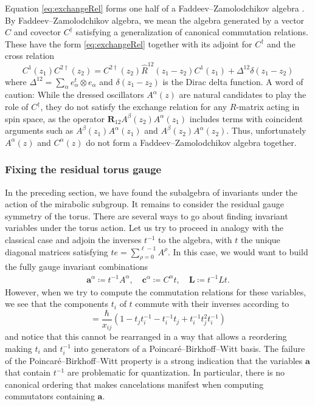 \begin{remark}\label{rem:FZAlg}
Equation \eqref{eq:exchangeRel} forms one half of a Faddeev--Zamolodchikov algebra \cite{zamolodchikov_factorized_1979,faddeev_quantum_1995}. By Faddeev--Zamolod\-chikov algebra, we mean the algebra generated by a vector $C$ and covector $C^\dagger$ satisfying a generalization of canonical commutation relations. These have the form \eqref{eq:exchangeRel} together with its adjoint for $C^\dagger$ and the cross relation
\begin{equation}
C^1(z_1) C^{2\dagger}(z_2) = C^{2\dagger}(z_2) \hat R^{12}(z_1-z_2) C^1(z_1) + \Delta^{12} \delta(z_1-z_2)    
\end{equation}
where $\Delta^{12} = \sum_\alpha e_\alpha^t \otimes e_\alpha$ and $\delta(z_1-z_2)$ is the Dirac delta function. A word of caution: While the dressed oscillators $A^\alpha(z)$ are natural candidates to play the role of $C^\dagger$, they do not satisfy the exchange relation for any $R$-matrix acting in spin space, as the operator $\mathbf{R}_{12} A^\beta(z_2) A^\alpha(z_1)$ includes terms with coincident arguments such as $A^\beta(z_1) A^\alpha(z_1)$ and $A^\beta(z_2) A^\alpha(z_2)$. Thus, unfortunately $A^\alpha(z)$ and $C^\alpha(z)$ do not form a Faddeev--Zamolodchikov algebra together.
\end{remark}

\subsubsection{Fixing the residual torus gauge}

In the preceding section, we have found the subalgebra of invariants under the action of the mirabolic subgroup. It remains to consider the residual gauge symmetry of the torus. There are several ways to go about finding invariant variables under the torus action. Let us try to proceed in analogy with the classical case and adjoin the inverses $t^{-1}$ to the algebra, with $t$ the unique diagonal matrices satisfying $te = \sum_{\rho=0}^{\ell-1} A^\rho$. In this case, we would want to build the fully gauge invariant combinations
\begin{align}
\mathbf{a}^\alpha \coloneq t^{-1} A^\alpha, \quad \mathbf{c}^\alpha \coloneq C^\alpha t, \quad \mathbf{L} \coloneq t^{-1} L t.
\end{align}
However, when we try to compute the commutation relations for these variables, we see that the components $t_i$ of $t$ commute with their inverses according to
\begin{equation}
[t_i^{-1},t_j] = \frac{\hbar}{x_{ij}} (1-t_j t_i^{-1}-t_i^{-1} t_j + t_i^{-1} t_j^2 t_i^{-1})
\end{equation}
and notice that this cannot be rearranged in a way that allows a reordering making $t_i$ and $t_i^{-1}$ into generators of a Poincaré--Birkhoff--Witt basis. The failure of the Poincaré--Birkhoff--Witt property is a strong indication that the variables $\mathbf{a}$ that contain $t^{-1}$ are problematic for quantization. In particular, there is no canonical ordering that makes cancelations manifest when computing commutators containing $\mathbf{a}$.


